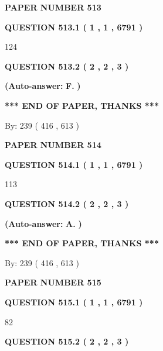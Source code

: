 \documentclass[12pt]{article}
\begin{document}
   
\newpage 
\setcounter{page}{ 
   513001 } 
   
   
 {\textbf{ \Large{ PAPER NUMBER  513  }}}
   
   
   
   
  
  
{\textbf{\large{QUESTION
513.1 
 ( 1 , 1 , 6791 )
}}}

124
  
  
{\textbf{\large{QUESTION
513.2 
 ( 2 , 2 , 3 )
}}}
 
 
{\textbf{(Auto-answer:}}
{\textbf{\large{
F.}}}
{\textbf{)}}
 
 
   
   
   
   
\vspace{1.0in} 
{\textbf{\large{ *** END OF PAPER, THANKS *** }}} 
   
   
\hspace{1.0in} By: 
 239 ( 416 ,  613 )
   
   
   
   
\newpage 
\setcounter{page}{ 
   514001 } 
   
   
 {\textbf{ \Large{ PAPER NUMBER  514  }}}
   
   
   
   
  
  
{\textbf{\large{QUESTION
514.1 
 ( 1 , 1 , 6791 )
}}}

113
  
  
{\textbf{\large{QUESTION
514.2 
 ( 2 , 2 , 3 )
}}}
 
 
{\textbf{(Auto-answer:}}
{\textbf{\large{
A.}}}
{\textbf{)}}
 
 
   
   
   
   
\vspace{1.0in} 
{\textbf{\large{ *** END OF PAPER, THANKS *** }}} 
   
   
\hspace{1.0in} By: 
 239 ( 416 ,  613 )
   
   
   
   
\newpage 
\setcounter{page}{ 
   515001 } 
   
   
 {\textbf{ \Large{ PAPER NUMBER  515  }}}
   
   
   
   
  
  
{\textbf{\large{QUESTION
515.1 
 ( 1 , 1 , 6791 )
}}}

82
  
  
{\textbf{\large{QUESTION
515.2 
 ( 2 , 2 , 3 )
}}}
 
\end{document}
